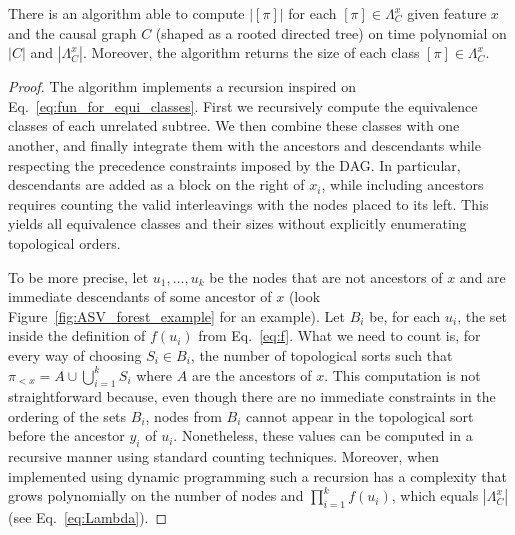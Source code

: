 \documentclass{llncs}
\begin{document}
\begin{proposition}
	There is an algorithm able to compute $|[\pi]|$ for each $[\pi] \in \Lambda^x_C$ given feature $x$ and the causal graph $C$ (shaped as a rooted directed tree) on time polynomial on $|C|$ and $|\Lambda^x_C|$. Moreover, the algorithm returns the size of each class $[\pi] \in \Lambda^x_C$.
\end{proposition}

\begin{proof}
	The algorithm implements a recursion inspired on Eq.~\eqref{eq:fun_for_equi_classes}. First we recursively compute the equivalence classes of each unrelated subtree. We then combine these classes with one another, and finally integrate them with the ancestors and descendants while respecting the precedence constraints imposed by the DAG. In particular, descendants are added as a block on the right of $x_i$, while including ancestors requires counting the valid interleavings with the nodes placed to its left. This yields all equivalence classes and their sizes without explicitly enumerating topological orders.

	To be more precise, let $u_1,\ldots,u_k$ be the nodes that are not ancestors of $x$ and are immediate descendants of some ancestor of $x$ (look Figure~\ref{fig:ASV_forest_example} for an example). Let $B_{i}$ be, for each $u_i$, the set inside the definition of $f(u_i)$ from Eq.~\eqref{eq:f}. What we need to count is, for every way of choosing $S_i \in B_{i}$, the number of topological sorts such that $\pi_{<x} = A \cup \bigcup_{i=1}^k S_i$ where $A$ are the ancestors of $x$.
	This computation is not straightforward because, even though there are no immediate constraints in the ordering of the sets $B_i$, nodes from $B_i$ cannot appear in the topological sort before the ancestor $y_i$ of $u_i$. Nonetheless, these values can be computed in a recursive manner using standard counting techniques. Moreover, when implemented using dynamic programming such a recursion has a complexity that grows polynomially on the number of nodes and $\prod_{i=1}^k f(u_i)$, which equals $|\Lambda^x_C|$ (see Eq.~\eqref{eq:Lambda}).
\end{proof}


\newcommand{\subsetPerm}{K}
\newcommand{\procedureSampling}{\mathcal{P}_{samp}}
\newcommand{\procedureNu}{\mathcal{P}_{\nu}}
\end{document}
